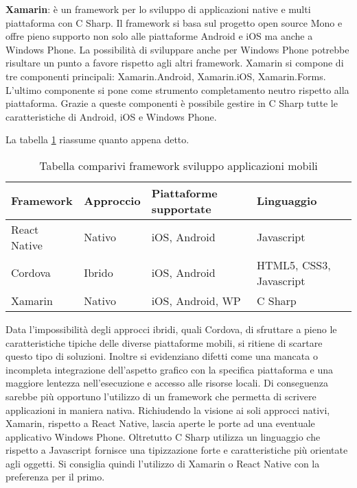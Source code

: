\textbf{Xamarin}: è un framework per lo sviluppo di applicazioni native e multi piattaforma con C Sharp. Il framework si basa sul progetto open source Mono e offre pieno supporto non solo alle piattaforme Android e iOS ma anche a Windows Phone. La possibilità di sviluppare anche per Windows Phone potrebbe risultare un punto a favore rispetto agli altri framework. Xamarin si compone di tre componenti principali: Xamarin.Android, Xamarin.iOS, Xamarin.Forms. L’ultimo componente si pone come strumento completamento neutro rispetto alla piattaforma. Grazie a queste componenti è possibile gestire in C Sharp tutte le caratteristiche di Android, iOS e Windows Phone.
\medskip

 La tabella \ref{tab:comp-framework} riassume quanto appena detto.
\begin{table}[!h] %
    \caption{Tabella comparivi framework sviluppo applicazioni mobili}
    \label{tab:comp-framework}
    \begin{tabularx}{\textwidth}{llll}
    \hline
    \textbf{Framework} & \textbf{Approccio} & \textbf{Piattaforme supportate} &\textbf{Linguaggio}\\
    \hline
    React Native   & Nativo & iOS, Android & Javascript\\
    \hline
    Cordova   & Ibrido & iOS, Android & HTML5, CSS3, Javascript\\
    \hline
    Xamarin   & Nativo & iOS, Android, WP & C Sharp\\
    \hline
    \end{tabularx}
    \end{table}%
Data l’impossibilità degli approcci ibridi, quali Cordova, di sfruttare a pieno le caratteristiche tipiche delle diverse piattaforme mobili, si ritiene di scartare questo tipo di soluzioni.
Inoltre si evidenziano difetti come una mancata o incompleta integrazione dell’aspetto grafico con la specifica piattaforma e una maggiore lentezza nell’esecuzione e accesso alle risorse locali.
Di conseguenza sarebbe più opportuno l’utilizzo di un framework che permetta di scrivere applicazioni in maniera nativa. 
Richiudendo la visione ai soli approcci nativi, Xamarin, rispetto a React Native, lascia aperte le porte ad una eventuale applicativo Windows Phone. Oltretutto C Sharp utilizza un linguaggio che rispetto a Javascript fornisce una tipizzazione forte e caratteristiche più orientate agli oggetti. Si consiglia quindi l’utilizzo di Xamarin o React Native con la preferenza per il primo.

